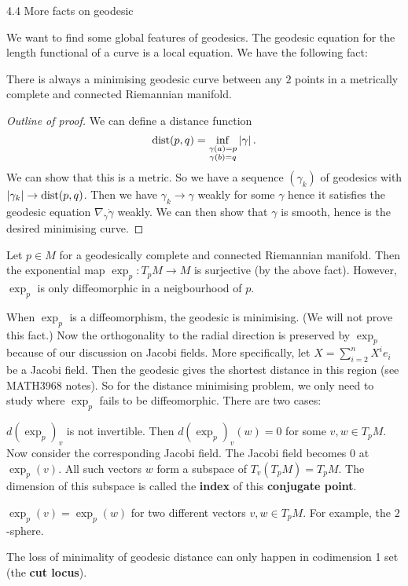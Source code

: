 4.4 More facts on geodesic

We want to find some global features of geodesics.
The geodesic equation for the length functional of a curve is a local equation.
We have the following fact:
\begin{prop}
  There is always a minimising geodesic curve between any $2$ points in a metrically complete and connected Riemannian manifold.
\end{prop}

\begin{proof}[Outline of proof]
  We can define a distance function
  \[ \operatorname{dist}(p,q) = \inf_{\substack{\gamma(a)=p\\ \gamma(b)=q}}\left\lvert \gamma \right\rvert. \]
  We can show that this is a metric.
  So we have a sequence $(\gamma_k)$ of geodesics with $\left\lvert \gamma_k \right\rvert\to\operatorname{dist}(p,q)$.
  Then we have $\gamma_k\to\gamma$ weakly for some $\gamma$ hence it satisfies the geodesic equation $\nabla_{\dot\gamma}\dot\gamma$ weakly.
  We can then show that $\gamma$ is smooth, hence is the desired minimising curve.
\end{proof}

Let $p\in M$ for a geodesically complete and connected Riemannian manifold.
Then the exponential map $\exp_p:T_pM\to M$ is surjective (by the above fact).
However, $\exp_p$ is only diffeomorphic in a neigbourhood of $p$.

When $\exp_p$ is a diffeomorphism, the geodesic is minimising.
(We will not prove this fact.)
Now the orthogonality to the radial direction is preserved by $\exp_p$ because of our discussion on Jacobi fields.
More specifically, let $X=\sum_{i=2}^nX^ie_i$ be a Jacobi field.
Then the geodesic gives the shortest distance in this region (see MATH3968 notes).
So for the distance minimising problem, we only need to study where $\exp_p$ fails to be diffeomorphic.
There are two cases:
\begin{enum}
  \io $d(\exp_p)_v$ is not invertible.
  Then $d(\exp_p)_v(w)=0$ for some $v,w\in T_pM$.
  Now consider the corresponding Jacobi field.
  The Jacobi field becomes $0$ at $\exp_p(v)$.
  All such vectors $w$ form a subspace of $T_v(T_pM)=T_pM$.
  The dimension of this subspace is called the \textbf{index} of this \textbf{conjugate point}.

  \io $\exp_p(v)=\exp_p(w)$ for two different vectors $v,w\in T_pM$.
  For example, the $2$-sphere.
\end{enum}

The loss of minimality of geodesic distance can only happen in codimension 1 set (the \textbf{cut locus}).
